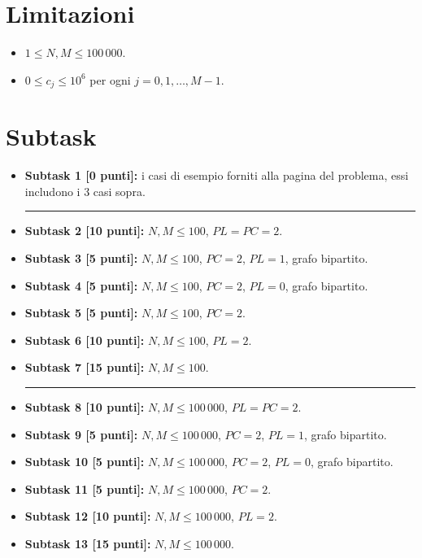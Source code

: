\section*{Limitazioni}

\begin{itemize}[nolistsep, itemsep=2mm]
	\item $1 \le N, M \le 100\,000$.
	\item $0 \leq c_j \le 10^6$ per ogni $j=0,1,\ldots,M-1$.
\end{itemize}

\section*{Subtask}

  \begin{itemize}
  \item \textbf{Subtask 1 [\phantom{1}0 punti]:} i casi di esempio forniti alla pagina del problema, essi includono i 3 casi sopra.
      \vspace{-0.6cm}
       \begin{center}
      \rule{0.5\textwidth}{0.4pt} \hfill  \hfill \hfill
       \end{center}
      \vspace{-0.6cm}      
    \item \textbf{Subtask 2 [10 punti]:} $N,M \leq 100$, $PL=PC=2$.
    \item \textbf{Subtask 3 [\phantom{1}5 punti]:} $N,M \leq 100$, $PC=2$, $PL=1$, grafo bipartito.
    \item \textbf{Subtask 4 [\phantom{1}5 punti]:} $N,M \leq 100$, $PC=2$, $PL=0$, grafo bipartito.
    \item \textbf{Subtask 5 [\phantom{1}5 punti]:} $N,M \leq 100$, $PC=2$.
    \item \textbf{Subtask 6 [10 punti]:} $N,M \leq 100$, $PL=2$.
    \item \textbf{Subtask 7 [15 punti]:} $N,M \leq 100$.
      \vspace{-0.6cm}
       \begin{center}
      \rule{0.5\textwidth}{0.4pt} \hfill  \hfill \hfill
       \end{center}
      \vspace{-0.6cm}      
    \item \textbf{Subtask 8 [10 punti]:} $N,M \leq 100\,000$, $PL=PC=2$.
    \item \textbf{Subtask 9 [\phantom{1}5 punti]:} $N,M \leq 100\,000$, $PC=2$, $PL=1$, grafo bipartito.
    \item \textbf{Subtask 10 [\phantom{1}5 punti]:} $N,M \leq 100\,000$, $PC=2$, $PL=0$, grafo bipartito.
    \item \textbf{Subtask 11 [\phantom{1}5 punti]:} $N,M \leq 100\,000$, $PC=2$.
    \item \textbf{Subtask 12 [10 punti]:} $N,M \leq 100\,000$, $PL=2$.
    \item \textbf{Subtask 13 [15 punti]:} $N,M \leq 100\,000$.
  \end{itemize}
